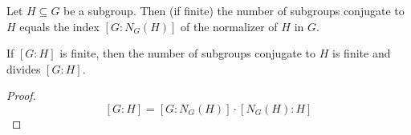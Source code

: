 \begin{lemma}
Let $H \subseteq G$ be a subgroup. Then (if finite) the number of subgroups conjugate to $H$ equals the index
$[G : N_G(H)]$ of the normalizer of $H$ in $G$.
\end{lemma}

\begin{corollary}
If $[G:H]$ is finite, then the number of subgroups conjugate to $H$ is finite and divides $[G:H]$.
\end{corollary}

\begin{proof}
$$[G : H] = [G : N_G(H)] \cdot [N_G(H) : H]$$
\end{proof}